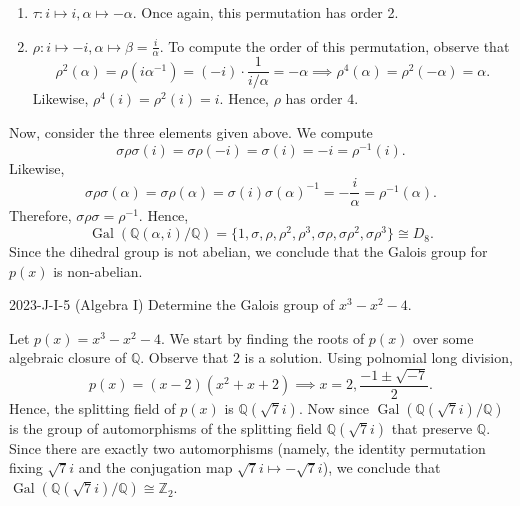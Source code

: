 \documentclass{article}
\begin{document}
\begin{solutions}
\begin{enumerate}[itemsep =-2pt,label = (\alph{*})]
\begin{enumerate}[itemsep =-2pt,label =(\roman{*})]
				\item $\tau: i \mapsto i, \alpha \mapsto -\alpha$. Once again, this permutation has order 2. 
				\item $\rho: i \mapsto -i, \alpha \mapsto \beta = \frac{i}{\alpha}$. To compute the order of this permutation, observe that 
					\begin{equation}
						\rho^{2}(\alpha) = \rho(i\alpha^{-1}) = (-i) \cdot \frac{1}{i/\alpha} = -\alpha \implies \rho^{4}(\alpha) = \rho^{2}(-\alpha) = \alpha. 
					\end{equation}
				Likewise, $\rho^{4}(i) = \rho^{2}(i) = i$. Hence, $\rho$ has order $4$. 
			\end{enumerate}
		Now, consider the three elements given above. We compute 
			\begin{equation}
				\sigma\rho\sigma(i) = \sigma\rho(-i) = \sigma(i) = -i = \rho^{-1}(i). 
			\end{equation}
		Likewise, 
			\begin{equation}
				\sigma\rho\sigma(\alpha) = \sigma\rho(\alpha) = \sigma(i)\sigma(\alpha)^{-1} = -\frac{i}{\alpha} = \rho^{-1}(\alpha). 
			\end{equation}
		Therefore, $\sigma \rho \sigma = \rho^{-1}$. Hence, 
			\begin{equation}
				\operatorname{Gal}(\mathbb{Q}(\alpha,i)/\mathbb{Q}) = \{1, \sigma, \rho, \rho^{2}, \rho^{3}, \sigma\rho, \sigma\rho^{2},  \sigma\rho^{3}\} \cong D_{8}. 
			\end{equation}
		Since the dihedral group is not abelian, we conclude that the Galois group for $p(x)$ is non-abelian. 
	\end{enumerate}
\end{solutions}
\begin{prb}{2023-J-I-5 (Algebra I)}
	Determine the Galois group of $x^{3} - x^{2} - 4$. 
\end{prb}
\begin{solutions}
	Let $p(x) = x^{3} - x^{2} - 4$. We start by finding the roots of $p(x)$ over some algebraic closure of $\mathbb{Q}$. Observe that $2$ is a solution. Using polnomial long division, 
		\begin{equation}
			p(x) = (x - 2)(x^{2} + x + 2) \implies x = 2, \frac{-1 \pm \sqrt{-7}}{2}. 
		\end{equation}
	Hence, the splitting field of $p(x)$ is $\mathbb{Q}(\sqrt{7}i)$. Now since $\operatorname{Gal}(\mathbb{Q}(\sqrt{7}i)/\mathbb{Q})$ is the group of automorphisms of the splitting field $\mathbb{Q}(\sqrt{7}i)$ that preserve $\mathbb{Q}$. Since there are exactly two automorphisms (namely, the identity permutation fixing $\sqrt{7}i$ and the conjugation map $\sqrt{7}i \mapsto -\sqrt{7}i$), we conclude that $\operatorname{Gal}(\mathbb{Q}(\sqrt{7}i)/\mathbb{Q}) \cong \mathbb{Z}_{2}$. 
\end{solutions}
\end{document}
